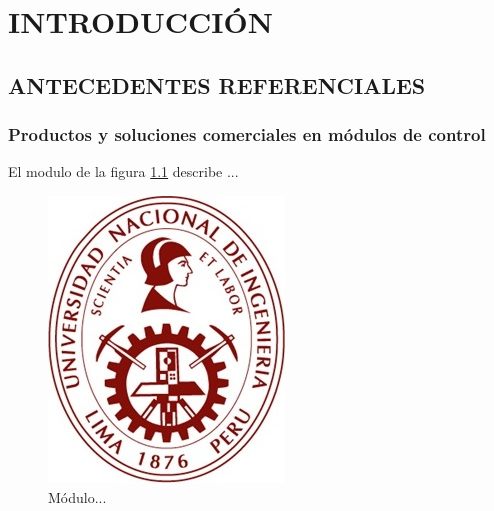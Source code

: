 %
%
%
%
%


\chapter{INTRODUCCIÓN}


\section{ANTECEDENTES REFERENCIALES}

\subsection{Productos y soluciones comerciales en módulos de control}
\begin{adjustwidth}{2.4em}{0em}
El modulo de la figura \ref{fig:logox} describe ...
\begin{figure}[H]
	\singlespacing
	\centering
	\includegraphics[width=0.2\linewidth]{logo}
	\caption[Módulo ...]{Módulo...}
	\label{fig:logox}
\end{figure}

\end{adjustwidth}

